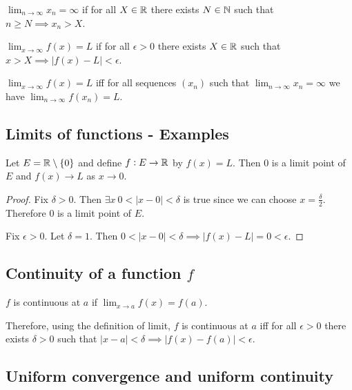 \begin{definition*}
  $\lim_{n \to \infty} x_n = \infty$ if for all $X \in \mathbb{R}$ there exists $N \in \mathbb{N}$ such that
  $n \geq N \implies x_n > X$.
\end{definition*}

\begin{definition*}
  $\lim_{x \to \infty} f(x) = L$ if for all $\epsilon > 0$ there exists $X \in \mathbb{R}$ such that
  $x > X \implies |f(x) - L| < \epsilon$.
\end{definition*}

\begin{theorem*}
  $\lim_{x \to \infty} f(x) = L$ iff for all sequences $(x_n)$ such that
  $\lim_{n \to \infty}x_n = \infty$ we have $\lim_{n \to \infty} f(x_n) = L$.
\end{theorem*}

\subsection{Limits of functions - Examples}

\begin{example}
  Let $E = \mathbb{R}\setminus \{0\}$ and define $f:E \to \mathbb{R}$ by $f(x) = L$. Then 0 is a limit point of
  $E$ and $f(x) \to L$ as $x \to 0$.
\end{example}

\begin{proof}
  Fix $\delta > 0$. Then $\exists x ~ 0 < |x - 0| < \delta$ is true since we can choose
  $x = \frac{\delta}{2}$. Therefore 0 is a limit point of $E$.

  Fix $\epsilon > 0$. Let $\delta = 1$. Then
  $0 < |x - 0| < \delta \implies |f(x) - L| = 0 < \epsilon$.
\end{proof}

\subsection{Continuity of a function $f$}

\begin{definition*}
$f$ is continuous at $a$ if $\lim_{x \to a} f(x) = f(a)$.
\end{definition*}

Therefore, using the definition of limit, $f$ is continuous at $a$ iff for all $\epsilon > 0$
there exists $\delta > 0$ such that $|x - a| < \delta \implies |f(x) - f(a)| < \epsilon$.

\subsection{Uniform convergence and uniform continuity}

